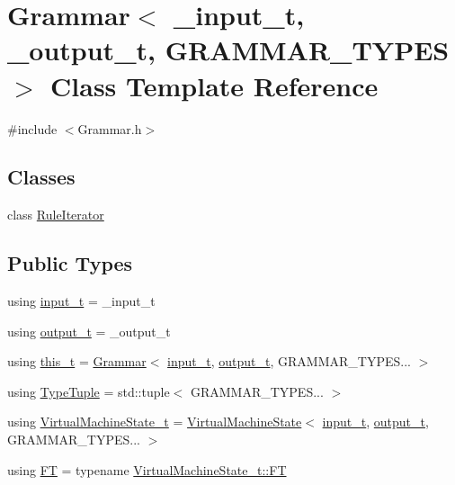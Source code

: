 \hypertarget{class_grammar}{}\section{Grammar$<$ \+\_\+input\+\_\+t, \+\_\+output\+\_\+t, G\+R\+A\+M\+M\+A\+R\+\_\+\+T\+Y\+P\+ES $>$ Class Template Reference}
\label{class_grammar}


{\ttfamily \#include $<$Grammar.\+h$>$}

\subsection*{Classes}
\begin{DoxyCompactItemize}
\item 
class \hyperlink{class_grammar_1_1_rule_iterator}{Rule\+Iterator}
\end{DoxyCompactItemize}
\subsection*{Public Types}
\begin{DoxyCompactItemize}
\item 
using \hyperlink{class_grammar_a11116f6d2f48f79def498a97549c67d4}{input\+\_\+t} = \+\_\+input\+\_\+t
\item 
using \hyperlink{class_grammar_aee7630d758322022048d06605b07e697}{output\+\_\+t} = \+\_\+output\+\_\+t
\item 
using \hyperlink{class_grammar_a3193857749e93b641ca05524f94c388e}{this\+\_\+t} = \hyperlink{class_grammar}{Grammar}$<$ \hyperlink{class_grammar_a11116f6d2f48f79def498a97549c67d4}{input\+\_\+t}, \hyperlink{class_grammar_aee7630d758322022048d06605b07e697}{output\+\_\+t}, G\+R\+A\+M\+M\+A\+R\+\_\+\+T\+Y\+P\+E\+S... $>$
\item 
using \hyperlink{class_grammar_abfb390f3654ce837c97c8b3d0d3b5f0f}{Type\+Tuple} = std\+::tuple$<$ G\+R\+A\+M\+M\+A\+R\+\_\+\+T\+Y\+P\+E\+S... $>$
\item 
using \hyperlink{class_grammar_a62e87cde3f753a426cc6688c4dde40b8}{Virtual\+Machine\+State\+\_\+t} = \hyperlink{class_virtual_machine_state}{Virtual\+Machine\+State}$<$ \hyperlink{class_grammar_a11116f6d2f48f79def498a97549c67d4}{input\+\_\+t}, \hyperlink{class_grammar_aee7630d758322022048d06605b07e697}{output\+\_\+t}, G\+R\+A\+M\+M\+A\+R\+\_\+\+T\+Y\+P\+E\+S... $>$
\item 
using \hyperlink{class_grammar_af9b9935f4da29e68087b25ef75f22564}{FT} = typename \hyperlink{class_virtual_machine_state_acacd9869c4a5ff3a765f6bd7d5bae35c}{Virtual\+Machine\+State\+\_\+t\+::\+FT}
\end{DoxyCompactItemize}
